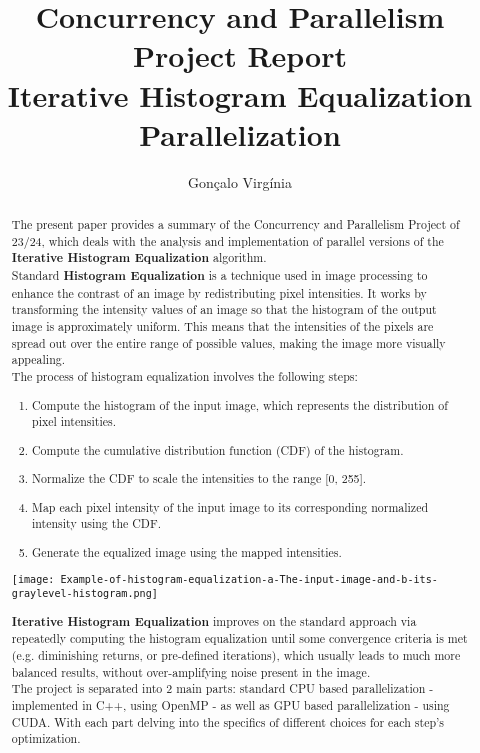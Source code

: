 \documentclass[sigconf]{acmart}
\begin{document}
\title{Concurrency and Parallelism Project Report\\Iterative Histogram Equalization Parallelization}

\author{Gonçalo Virgínia}

\begin{abstract}

The present paper provides a summary of the Concurrency and Parallelism Project of 23/24, which deals with the analysis and implementation of parallel versions of the \textbf{Iterative Histogram Equalization} algorithm.\\

Standard \textbf{Histogram Equalization} is a technique used in image processing to enhance the contrast of an image by redistributing pixel intensities. It works by transforming the intensity values of an image so that the histogram of the output image is approximately uniform. This means that
the intensities of the pixels are spread out over the entire range of possible values, making the
image more visually appealing.\\
The process of histogram equalization involves the following
steps:
\begin{enumerate}
    \item Compute the histogram of the input image, which represents the distribution of pixel
intensities.
    \item Compute the cumulative distribution function (CDF) of the histogram.
    \item Normalize the CDF to scale the intensities to the range [0, 255].
    \item Map each pixel intensity of the input image to its corresponding normalized intensity
using the CDF.
    \item Generate the equalized image using the mapped intensities.
\end{enumerate}

\begin{center}
\texttt{[image: Example-of-histogram-equalization-a-The-input-image-and-b-its-graylevel-histogram.png]}
\cite{article1}
\end{center}

\textbf{Iterative Histogram Equalization} improves on the standard approach via repeatedly computing the histogram equalization until some convergence criteria is met (e.g. diminishing returns, or pre-defined iterations), which usually leads to much more balanced results, without over-amplifying noise present in the image.\\

The project is separated into 2 main parts: standard CPU based parallelization - implemented in C++, using OpenMP - as well as GPU based parallelization - using CUDA. With each part delving into the specifics of different choices for each step's optimization.

\end{abstract}
\end{document}
